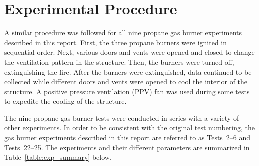
\renewcommand{\thechapter}{3}

\chapter{Experimental Procedure}
\label{chap:exp_procedure}

A similar procedure was followed for all nine propane gas burner experiments described in this report. First, the three propane burners were ignited in sequential order. Next, various doors and vents were opened and closed to change the ventilation pattern in the structure. Then, the burners were turned off, extinguishing the fire. After the burners were extinguished, data continued to be collected while different doors and vents were opened to cool the interior of the structure. A positive pressure ventilation (PPV) fan was used during some tests to expedite the cooling of the structure. 

The nine propane gas burner tests were conducted in series with a variety of other experiments. In order to be consistent with the original test numbering, the gas burner experiments described in this report are referred to as Tests~2--6 and Tests~22--25. The experiments and their different parameters are summarized in Table~\ref{table:exp_summary} below.

